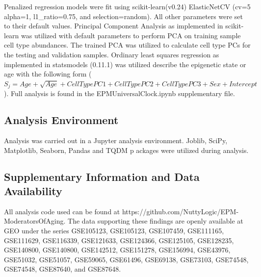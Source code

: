 \documentclass{article}
\begin{document}
{\begin{linenumbers}
Penalized regression models were fit using scikit-learn(v0.24)\cite{Pedregosa2011-fi} 
ElasticNetCV (cv=5 alpha=1, l1\_ratio=0.75, and selection=random). All other parameters were set to their 
default values. Principal Component Analysis as implemented in scikit-learn was utilized with default parameters 
to perform PCA on training sample cell type abundances. The trained PCA was utilized to calculate cell type PCs 
for the testing and validation samples. Ordinary least squares regression as implemented in statsmodels 
(0.11.1)\cite{Seabold2010-lt} was utilized describe the epigenetic state or age with the following 
form ($S_j  = Age + \sqrt{Age} + Cell Type PC1 + Cell Type PC2 + Cell Type PC3 + Sex + Intercept$). 
Full analysis is found in the EPMUniversalClock.ipynb supplementary file. 

\subsection{Analysis Environment}

Analysis was carried out in a Jupyter\cite{Basu_undated-vq} analysis environment.
 Joblib\cite{Varoquaux2009-al}, SciPy\cite{Virtanen2020-wt}, Matplotlib\cite{Hunter2007-nq}, 
 Seaborn\cite{Waskom2021-gj}, Pandas\cite{McKinney2012-ta} and TQDM\cite{Da_Costa-Luis2019-lr} p
 ackages were utilized during analysis. 

\subsection{Supplementary Information and Data Availability}

All analysis code used can be found at https://github.com/NuttyLogic/EPM-ModeratorsOfAging. The data supporting these 
findings are openly available at GEO under the series GSE105123, GSE105123, GSE107459, GSE111165, GSE111629, GSE116339, 
GSE121633, GSE124366, GSE125105, GSE128235, GSE140800, GSE140800, GSE142512, GSE151278, GSE156994, GSE43976, GSE51032, 
GSE51057, GSE59065, GSE61496, GSE69138, GSE73103, GSE74548, GSE74548, GSE87640, and GSE87648.

\end{linenumbers}
\printbibliography



}
\end{document}
